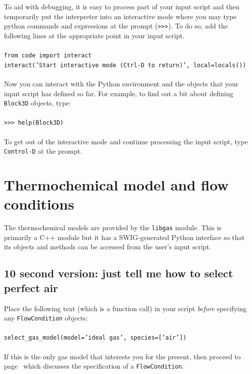 \medskip
To aid with debugging, it is easy to process part of your input script and
then temporarily put the interpreter into an interactive mode where 
you may type python commands and expressions at the prompt (\texttt{>>>}).
To do so, add the following lines at the appropriate point in your input
script.\\
%
\topbar\\
\texttt{from code import interact}\\
\texttt{interact('Start interactive mode (Ctrl-D to return)', local=locals())}\\
\bottombar\\
%
Now you can interact with the Python environment and the objects that your
input script has defined so far.
For example, to find out a bit about defining \texttt{Block3D} objects, type:\\
%
\topbar\\
\texttt{>>> help(Block3D)}\\
\bottombar\\
%
To get out of the interactive mode and continue processing the input script,
type \texttt{Control-D} at the prompt.


\section{Thermochemical model and flow conditions}
\label{thermo-flow-sec}
%
The thermochemical models are provided by the \texttt{libgas} module.
This is primarily a C++ module but it has a SWIG-generated Python interface so
that its objects and methods can be accessed from the user's input script.

\subsection{10 second version: just tell me how to select perfect air}
Place the following text (which is a function call) in your script \emph{before}
specifying any \texttt{FlowCondition} objects:\\
%
\topbar\\
\texttt{select\_gas\_model(model='ideal gas', species=['air'])}\\ 
\bottombar\\
%
If this is the only gas model that interests you for the present, then
proceed to page~\pageref{sec:flow_condition} which discusses the specification
of a \texttt{FlowCondition}.

